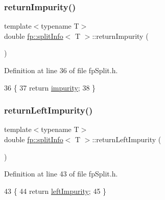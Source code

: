 \subsubsection{\texorpdfstring{return\+Impurity()}{returnImpurity()}}
{\footnotesize\ttfamily template$<$typename T$>$ \\
double \hyperlink{classfp_1_1splitInfo}{fp\+::split\+Info}$<$ T $>$\+::return\+Impurity (\begin{DoxyParamCaption}{ }\end{DoxyParamCaption})\hspace{0.3cm}{\ttfamily [inline]}}



Definition at line 36 of file fp\+Split.\+h.


\begin{DoxyCode}
36                                               \{
37                     \textcolor{keywordflow}{return} \hyperlink{classfp_1_1splitInfo_aada04419633efd2c337ee25a654f3339}{impurity};
38                 \}
\end{DoxyCode}
\mbox{\label{classfp_1_1splitInfo_afa74525821fe756dac9c71a72cddf58c}} 
\subsubsection{\texorpdfstring{return\+Left\+Impurity()}{returnLeftImpurity()}}
{\footnotesize\ttfamily template$<$typename T$>$ \\
double \hyperlink{classfp_1_1splitInfo}{fp\+::split\+Info}$<$ T $>$\+::return\+Left\+Impurity (\begin{DoxyParamCaption}{ }\end{DoxyParamCaption})\hspace{0.3cm}{\ttfamily [inline]}}



Definition at line 43 of file fp\+Split.\+h.


\begin{DoxyCode}
43                                                   \{
44                     \textcolor{keywordflow}{return} \hyperlink{classfp_1_1splitInfo_a07ad3b8d248d48e3157aa44a2452bc8c}{leftImpurity};
45                 \}
\end{DoxyCode}
\mbox{\label{classfp_1_1splitInfo_afe9b9329a28de129e8114d52662c3741}} 
